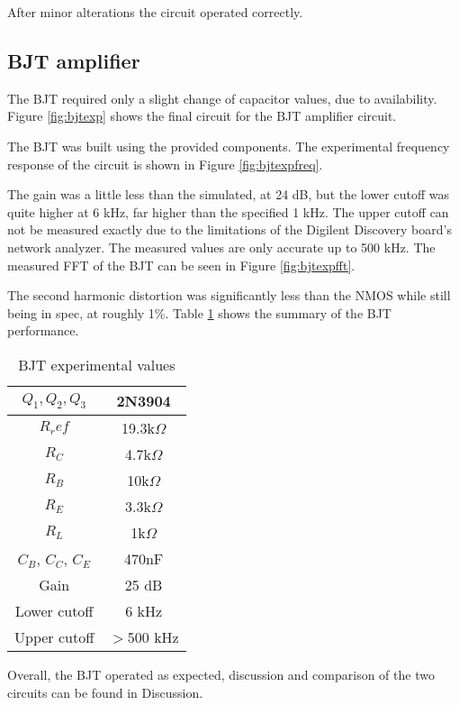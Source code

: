 After minor alterations the circuit operated correctly.



\subsection{BJT amplifier}

The BJT required only a slight change of capacitor values, due to availability. Figure \ref{fig:bjtexp} shows the final circuit for the BJT amplifier circuit.



The BJT was built using the provided components. The experimental frequency response of the circuit is shown in Figure \ref{fig:bjtexpfreq}.




The gain was a little less than the simulated, at 24 dB, but the lower cutoff was quite higher at 6 kHz, far higher than the specified 1 kHz. The upper cutoff can not be measured exactly due to the limitations of the Digilent Discovery board's network analyzer. The measured values are only accurate up to 500 kHz. The measured FFT of the BJT can be seen in Figure \ref{fig:bjtexpfft}.



The second harmonic distortion was significantly less than the NMOS while still being in spec, at roughly 1\%. Table \ref{tab:bjtexp} shows the summary of the BJT performance.




\begin{table}[H]
	\centering
	\caption{BJT experimental values}
	\label{tab:bjtexp}
	\begin{tabular}{|c|c|} \hline
		$Q_1, Q_2, Q_3$ & 2N3904        \\ \hline
		$R_ref$         & 19.3k$\Omega$ \\ \hline
		$R_C$           & 4.7k$\Omega$  \\ \hline
		$R_B$           & 10k$\Omega$   \\ \hline 
		$R_E$           & 3.3k$\Omega$  \\ \hline 
		$R_L$           & 1k$\Omega$    \\ \hline
		$C_B$, $C_C$, $C_E$ & 470nF     \\ \hline
		Gain           & 25 dB          \\ \hline
		Lower cutoff   & 6 kHz          \\ \hline
		Upper cutoff   &  $>$500 kHz      \\ \hline
	\end{tabular}
\end{table}

Overall, the BJT operated as expected, discussion and comparison of the two circuits can be found in Discussion.


%



